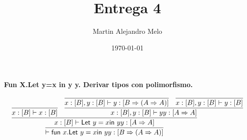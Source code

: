 \documentclass[a4paper,10pt]{article} %
\title{Entrega 4}
\author{Martin Alejandro Melo}
\date{\today}
\newcommand\fun{\textsf{fun}~}  %
\newcommand\Let{\textsf{Let}~}
\newcommand\In{\textsf{in}~}
\begin{document}
\maketitle  
	
	
	\textbf{Fun X.Let y=x in y y. Derivar tipos con polimorfismo.}
	\vspace{5mm}
	
	\[
  \infer{\vdash\fun x.\Let y=x\In yy:[B\Rightarrow(A\Rightarrow A)]}
  {
    \infer{x:[B]\vdash\Let y=x\In yy:[A\Rightarrow A]}
    {
      \infer{x:[B]\vdash x:[B]}{}
      &
      \infer{x:[B],y:[B]\vdash yy:[A\Rightarrow A]}
      {
	\infer{x:[B],y:[B]\vdash y:[B\Rightarrow(A\Rightarrow A)]}{}
	&
	\infer{x:[B],y:[B]\vdash y:[B]}{}
      }
    }
  }
\]
	
	\vspace{5mm}
	
	

	
\end{document}
